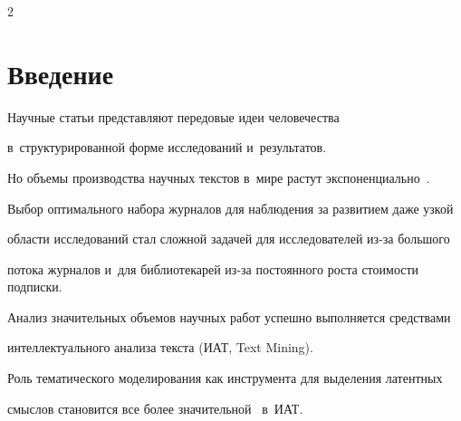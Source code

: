     




 















\thispagestyle{headings}





\begin{multicols}{2}





\label{st\stat}


    


    \section{Введение}


    


    Научные статьи представляют передовые идеи человечества 


    в~структурированной форме исследований и~результатов.


    Но объемы производства научных текстов в~мире растут экспоненциально~\cite{verstak2014shoulders}.


    Выбор оптимального набора журналов для наблюдения за развитием даже узкой 


области исследований стал сложной задачей для исследователей из-за большого 


потока журналов и~для библиотекарей из-за постоянного роста стоимости подписки.


    


    Анализ значительных объемов научных работ успешно выполняется средствами 


интеллектуального анализа текста (ИАТ, Text Mining).


    Роль тематического моделирования как инструмента для выделения латентных 


смыслов становится все более значительной~\cite{jelodar2018latent} в~ИАТ.



\end{multicols}
